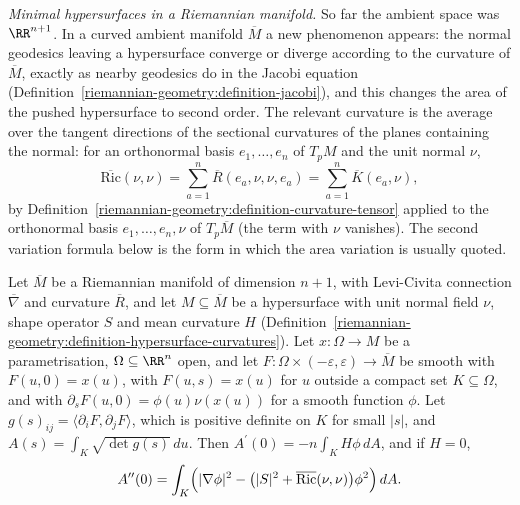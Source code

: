 \emph{Minimal hypersurfaces in a Riemannian manifold.} So far the ambient space was $\RR^{n+1}$. In a curved ambient manifold $\overline{M}$ a new phenomenon appears: the normal
geodesics leaving a hypersurface converge or diverge according to the curvature of $\overline{M}$, exactly as nearby geodesics do in the Jacobi equation
(Definition~\ref{riemannian-geometry:definition-jacobi}), and this changes the area of the pushed hypersurface to second order. The relevant curvature is the average over the
tangent directions of the sectional curvatures of the planes containing the normal: for an orthonormal basis $e_1, \ldots, e_n$ of $T_pM$ and the unit normal $\nu$,
\[
\overline{\mathrm{Ric}}(\nu, \nu) = \sum_{a=1}^n\overline{R}(e_a, \nu, \nu, e_a) = \sum_{a=1}^n\overline{K}(e_a, \nu),
\]
by Definition~\ref{riemannian-geometry:definition-curvature-tensor} applied to the orthonormal basis $e_1, \ldots, e_n, \nu$ of $T_p\overline{M}$ (the term with $\nu$ vanishes). The
second variation formula below is the form in which the area variation is usually quoted.

\begin{proposition}\label{riemannian-geometry:proposition-variation-area-riemannian}
Let $\overline{M}$ be a Riemannian manifold of dimension $n + 1$, with Levi-Civita connection $\overline{\nabla}$ and curvature $\overline{R}$, and let $M \subseteq \overline{M}$ be a
hypersurface with unit normal field $\nu$, shape operator $S$ and mean curvature $H$ (Definition~\ref{riemannian-geometry:definition-hypersurface-curvatures}). Let
$x \colon \Omega \to M$ be a parametrisation, $\Omega \subseteq \RR^n$ open, and let $F \colon \Omega \times (-\varepsilon, \varepsilon) \to \overline{M}$ be smooth with $F(u, 0) = x(u)$,
with $F(u, s) = x(u)$ for $u$ outside a compact set $K \subseteq \Omega$, and with $\partial_sF(u, 0) = \phi(u)\nu(x(u))$ for a smooth function $\phi$. Let
$g(s)_{ij} = \langle\partial_iF, \partial_jF\rangle$, which is positive definite on $K$ for small $|s|$, and $A(s) = \int_K\sqrt{\det g(s)}\,du$. Then $A^{\prime}(0) = -n\int_KH\phi\,dA$,
and if $H = 0$,
\[
A^{\prime\prime}(0) = \int_K\Bigl(|\nabla\phi|^2 - \bigl(|S|^2 + \overline{\mathrm{Ric}}(\nu, \nu)\bigr)\phi^2\Bigr)\,dA .
\]
\end{proposition}


